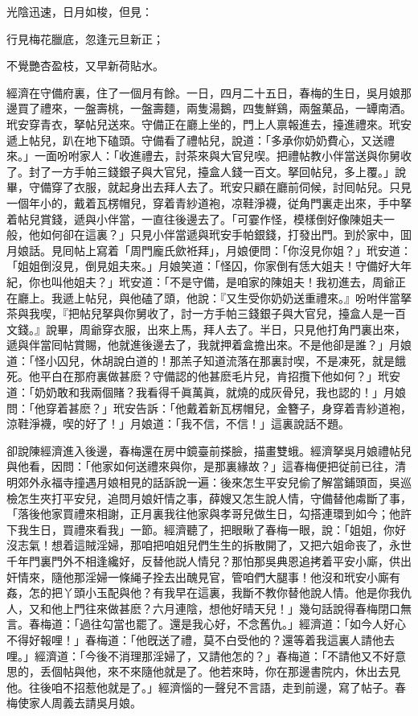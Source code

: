 光陰迅速，日月如梭，但見：

\begin{myquote}
行見梅花臘底，忽逢元旦新正；

不覺艷杏盈枝，又早新荷貼水。
\end{myquote}

經濟在守備府裏，住了一個月有餘。一日，四月二十五日，春梅的生日，吳月娘那邊買了禮來，一盤壽桃，一盤壽麵，兩隻湯鵝，四隻鮮鷄，兩盤菓品，一罈南酒。玳安穿青衣，拏帖兒送來。守備正在廳上坐的，門上人禀報進去，擡進禮來。玳安遞上帖兒，趴在地下磕頭。守備看了禮帖兒，說道：「多承你奶奶費心，又送禮來。」一面吩咐家人：「收進禮去，討茶來與大官兒喫。把禮帖教小伴當送與你舅收了。封了一方手帕三錢銀子與大官兒，擡盒人錢一百文。拏回帖兒，多上覆。」說畢，守備穿了衣服，就起身出去拜人去了。玳安只顧在廳前伺候，討囘帖兒。只見一個年小的，戴着瓦楞帽兒，穿着青紗道袍，凉鞋淨襪，従角門裏走出來，手中拏着帖兒賞錢，遞與小伴當，一直往後邊去了。「可霎作怪，模樣倒好像陳姐夫一般，他如何卻在這裏？」只見小伴當遞與玳安手帕銀錢，打發出門。到於家中，囬月娘話。見囘帖上寫着「周門龐氏歛袵拜」，月娘便問：「你沒見你姐？」玳安道：「姐姐倒沒見，倒見姐夫來。」月娘笑道：「怪囚，你家倒有恁大姐夫！守備好大年紀，你也叫他姐夫？」玳安道：「不是守備，是咱家的陳姐夫！我初進去，周爺正在廳上。我遞上帖兒，與他磕了頭，他說：『又生受你奶奶送重禮來。』吩咐伴當拏茶與我喫，『把帖兒拏與你舅收了，討一方手帕三錢銀子與大官兒，擡盒人是一百文錢。』說畢，周爺穿衣服，出來上馬，拜人去了。半日，只見他打角門裏出來，遞與伴當囘帖賞賜，他就進後邊去了，我就押着盒擔出來。不是他卻是誰？」月娘道：「怪小囚兒，休胡說白道的！那羔子知道流落在那裏討喫，不是凍死，就是餓死。他平白在那府裏做甚麽？守備認的他甚麽毛片兒，肯招攬下他如何？」玳安道：「奶奶敢和我兩個賭？我看得千眞萬眞，就燒的成灰骨兒，我也認的！」月娘問：「他穿着甚麽？」玳安告訴：「他戴着新瓦楞帽兒，金簪子，身穿着青紗道袍，涼鞋淨襪，喫的好了！」月娘道：「我不信，不信！」這裏說話不題。

卻說陳經濟進入後邊，春梅還在房中鏡臺前搽臉，描畫雙蛾。經濟拏吳月娘禮帖兒與他看，因問：「他家如何送禮來與你，是那裏緣故？」這春梅便把従前已往，清明郊外永福寺撞遇月娘相見的話訴說一遍：後來怎生平安兒偷了解當鋪頭靣，吳巡檢怎生夾打平安兒，追問月娘奸情之事，薛嫂又怎生說人情，守備替他䖏斷了事，「落後他家買禮來相謝，正月裏我往他家與孝哥兒做生日，勾搭連環到如今；他許下我生日，買禮來看我」一節。經濟聽了，把眼瞅了春梅一眼，說：「姐姐，你好沒志氣！想着這賊淫婦，那咱把咱姐兒們生生的拆散開了，又把六姐命丧了，永世千年門裏門外不相逢纔好，反替他説人情兒？那怕那吳典恩追拷着平安小廝，供出奸情來，隨他那淫婦一條䋲子拴去出醜見官，管咱們大腿事！他沒和玳安小廝有姦，怎的把丫頭小玉配與他？有我早在這裏，我斷不教你替他說人情。他是你我仇人，又和他上門往來做甚麽？六月連陰，想他好晴天兒！」幾句話說得春梅閉口無言。春梅道：「過往勾當也罷了。還是我心好，不念舊仇。」經濟道：「如今人好心不得好報哩！」春梅道：「他旣送了禮，莫不白受他的？還等着我這裏人請他去哩。」經濟道：「今後不消理那淫婦了，又請他怎的？」春梅道：「不請他又不好意思的，丢個帖與他，來不來隨他就是了。他若來時，你在那邊書院内，休出去見他。往後咱不招惹他就是了。」經濟惱的一聲兒不言語，走到前邊，寫了帖子。春梅使家人周義去請吳月娘。

